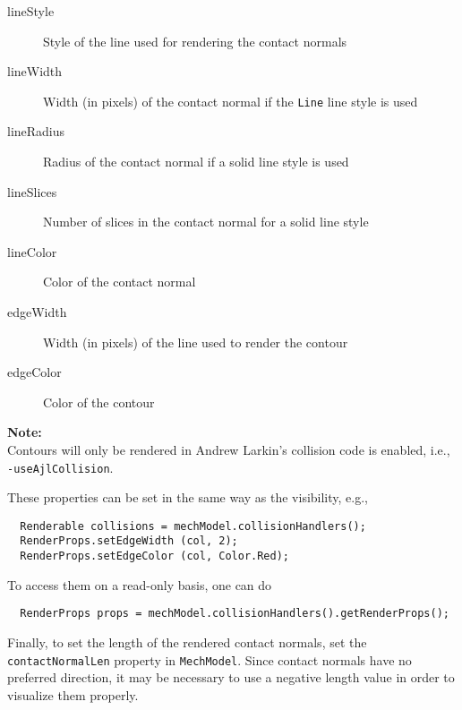\documentclass{article}
\begin{document}
\begin{description}

\item[lineStyle] \mbox{}
Style of the line used for rendering the contact normals

\item[lineWidth] \mbox{}
Width (in pixels) of the contact normal if the {\tt Line} line style is used

\item[lineRadius] \mbox{}
Radius of the contact normal if a solid line style is used

\item[lineSlices] \mbox{}
Number of slices in the contact normal for a solid line style

\item[lineColor] \mbox{}
Color of the contact normal

\item[edgeWidth] \mbox{}
Width (in pixels) of the line used to render the contour

\item[edgeColor] \mbox{}
Color of the contour

\end{description}

\begin{sideblock}
{\bf Note:}\\
Contours will only be rendered in Andrew Larkin's collision
code is enabled, i.e., {\tt -useAjlCollision}.
\end{sideblock}

These properties can be set in the same way as the visibility, e.g.,

\begin{lstlisting}
  Renderable collisions = mechModel.collisionHandlers();
  RenderProps.setEdgeWidth (col, 2);
  RenderProps.setEdgeColor (col, Color.Red);
\end{lstlisting}

To access them on a read-only basis, one can do
  
\begin{lstlisting}
  RenderProps props = mechModel.collisionHandlers().getRenderProps();
\end{lstlisting}

Finally, to set the length of the rendered contact normals, set the
{\tt contactNormalLen} property in {\tt MechModel}. Since contact normals have
no preferred direction, it may be necessary to use a negative length
value in order to visualize them properly.
\end{document}
